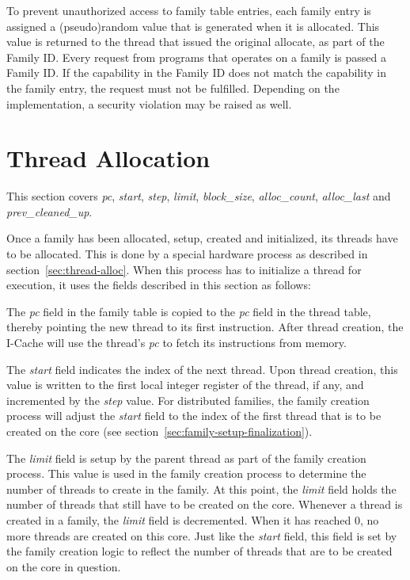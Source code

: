 To prevent unauthorized access to family table entries, each family entry is assigned a (pseudo)random value that is generated when it is allocated. This value is returned to the thread that issued the original allocate, as part of the Family ID. Every request from programs that operates on a family is passed a Family ID. If the capability in the Family ID does not match the capability in the family entry, the request must not be fulfilled. Depending on the implementation, a security violation may be raised as well.

\section{Thread Allocation}
This section covers \emph{pc}, \emph{start}, \emph{step}, \emph{limit}, \emph{block\_size}, \emph{alloc\_count}, \emph{alloc\_last} and \emph{prev\_cleaned\_up}.

Once a family has been allocated, setup, created and initialized, its threads have to be allocated. This is done by a special hardware process as described in section~\ref{sec:thread-alloc}. When this process has to initialize a thread for execution, it uses the fields described in this section as follows:

The \emph{pc} field in the family table is copied to the \emph{pc} field in the thread table, thereby pointing the new thread to its first instruction. After thread creation, the I-Cache will use the thread's \emph{pc} to fetch its instructions from memory.

The \emph{start} field indicates the index of the next thread. Upon thread creation, this value is written to the first local integer register of the thread, if any, and incremented by the \emph{step} value. For distributed families, the family creation process will adjust the \emph{start} field to the index of the first thread that is to be created on the core (see section~\ref{sec:family-setup-finalization}).

The \emph{limit} field is setup by the parent thread as part of the family creation process. This value is used in the family creation process to determine the number of threads to create in the family. At this point, the \emph{limit} field holds the number of threads that still have to be created on the core. Whenever a thread is created in a family, the \emph{limit} field is decremented. When it has reached 0, no more threads are created on this core. Just like the \emph{start} field, this field is set by the family creation logic to reflect the number of threads that are to be created on the core in question.

